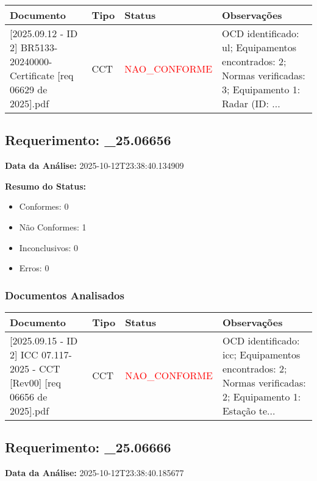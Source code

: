 \documentclass[12pt,a4paper]{article}
\begin{document}
\begin{longtable}{|p{4cm}|p{2cm}|p{2cm}|p{6cm}|}
\hline
\textbf{Documento} & \textbf{Tipo} & \textbf{Status} & \textbf{Observações} \\
\hline
\endhead
[Certificado de Conformidade Técnica - CCT][2025.09.12 - ID 2] BR5133-20240000-Certificate [req 06629 de 2025].pdf & CCT & \textcolor{red}{NAO\_CONFORME} & OCD identificado: ul; Equipamentos encontrados: 2; Normas verificadas: 3; Equipamento 1: Radar (ID: ... \\
\hline
\end{longtable}


\subsection{Requerimento: \_25.06656}

\textbf{Data da Análise:} 2025-10-12T23:38:40.134909

\textbf{Resumo do Status:}
\begin{itemize}
    \item Conformes: 0
    \item Não Conformes: 1
    \item Inconclusivos: 0
    \item Erros: 0
\end{itemize}

\subsubsection{Documentos Analisados}

\begin{longtable}{|p{4cm}|p{2cm}|p{2cm}|p{6cm}|}
\hline
\textbf{Documento} & \textbf{Tipo} & \textbf{Status} & \textbf{Observações} \\
\hline
\endhead
[Certificado de Conformidade Técnica - CCT][2025.09.15 - ID 2] ICC 07.117-2025 - CCT [Rev00] [req 06656 de 2025].pdf & CCT & \textcolor{red}{NAO\_CONFORME} & OCD identificado: icc; Equipamentos encontrados: 2; Normas verificadas: 2; Equipamento 1: Estação te... \\
\hline
\end{longtable}


\subsection{Requerimento: \_25.06666}

\textbf{Data da Análise:} 2025-10-12T23:38:40.185677
\end{document}

